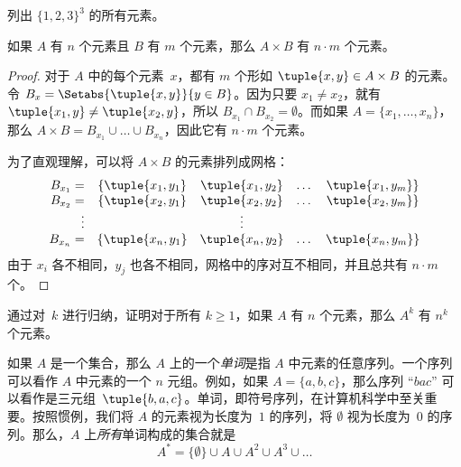 \documentclass[../../../include/open-logic-section]{subfiles}
\begin{document}
\begin{prob}
列出 $\{1, 2, 3\}^3$ 的所有元素。
\end{prob}

\begin{prop}
如果 $A$ 有 $n$ 个元素且 $B$ 有 $m$ 个元素，那么 $A \times B$ 有 $n\cdot m$ 个元素。
\end{prop}

\begin{proof}
对于 $A$ 中的每个元素~$x$，都有 $m$ 个形如 $\tuple{x, y} \in A \times B$ 的元素。令 $B_x = \Setabs{\tuple{x, y}}{y
  \in B}$。因为只要 $x_1 \neq x_2$，就有 $\tuple{x_1, y} \neq
\tuple{x_2, y}$，所以 $B_{x_1} \cap B_{x_2} = \emptyset$。而如果 $A = \{x_1,
\dots, x_n\}$，那么 $A \times B = B_{x_1} \cup \dots \cup B_{x_n}$，因此它有 $n\cdot m$ 个元素。

为了直观理解，可以将 $A \times B$ 的元素排列成网格：
\[
\begin{array}{rcccc}
  B_{x_1} = & \{\tuple{x_1, y_1} & \tuple{x_1, y_2} & \dots & \tuple{x_1, y_m}\}\\
  B_{x_2} = & \{\tuple{x_2, y_1} & \tuple{x_2, y_2} & \dots & \tuple{x_2, y_m}\}\\
  \vdots & & \vdots\\
  B_{x_n} = & \{\tuple{x_n, y_1} & \tuple{x_n, y_2} & \dots & \tuple{x_n, y_m}\}
\end{array}
\]
由于 $x_i$ 各不相同，$y_j$ 也各不相同，网格中的序对互不相同，并且总共有 $n\cdot m$ 个。
\end{proof}

\begin{prob}
通过对~$k$ 进行归纳，证明对于所有 $k \ge 1$，如果 $A$ 有 $n$ 个元素，那么 $A^k$ 有 $n^k$ 个元素。
\end{prob}

\begin{ex}
如果 $A$ 是一个集合，那么 $A$ 上的一个\emph{单词}是指 $A$ 中元素的任意序列。一个序列可以看作 $A$ 中元素的一个 $n$ 元组。例如，如果 $A = \{a, b, c\}$，那么序列 “$bac$” 可以看作是三元组~$\tuple{b, a, c}$。单词，即符号序列，在计算机科学中至关重要。按照惯例，我们将 $A$ 的元素视为长度为~$1$ 的序列，将 $\emptyset$ 视为长度为~$0$ 的序列。那么，$A$ 上\emph{所有}单词构成的集合就是
\[
A^* = \{\emptyset\} \cup A \cup A^2 \cup A^3 \cup \dots
\]
\end{ex}
\end{document}
